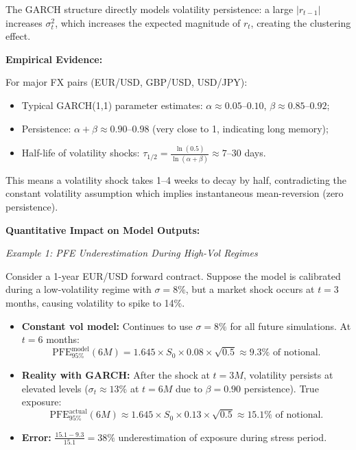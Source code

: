 The GARCH structure directly models volatility persistence: a large $|r_{t-1}|$ increases $\sigma_t^2$, which increases the expected magnitude of $r_t$, creating the clustering effect.

\textbf{Empirical Evidence:}

For major FX pairs (EUR/USD, GBP/USD, USD/JPY):
\begin{itemize}
	\item Typical GARCH(1,1) parameter estimates: $\alpha \approx 0.05$--$0.10$, $\beta \approx 0.85$--$0.92$;
	\item Persistence: $\alpha + \beta \approx 0.90$--$0.98$ (very close to 1, indicating long memory);
	\item Half-life of volatility shocks: $\tau_{1/2} = \frac{\ln(0.5)}{\ln(\alpha + \beta)} \approx 7$--30 days.
\end{itemize}

This means a volatility shock takes 1--4 weeks to decay by half, contradicting the constant volatility assumption which implies instantaneous mean-reversion (zero persistence).

\textbf{Quantitative Impact on Model Outputs:}

\textit{Example 1: PFE Underestimation During High-Vol Regimes}

Consider a 1-year EUR/USD forward contract. Suppose the model is calibrated during a low-volatility regime with $\sigma = 8\%$, but a market shock occurs at $t = 3$ months, causing volatility to spike to 14\%.

\begin{itemize}
	\item \textbf{Constant vol model:} Continues to use $\sigma = 8\%$ for all future simulations. At $t = 6$ months:
	\begin{equation}
		\text{PFE}_{95\%}^{\text{model}}(6M) = 1.645 \times S_0 \times 0.08 \times \sqrt{0.5} \approx 9.3\% \text{ of notional}.
	\end{equation}
	
	\item \textbf{Reality with GARCH:} After the shock at $t = 3M$, volatility persists at elevated levels ($\sigma_t \approx 13\%$ at $t = 6M$ due to $\beta = 0.90$ persistence). True exposure:
	\begin{equation}
		\text{PFE}_{95\%}^{\text{actual}}(6M) \approx 1.645 \times S_0 \times 0.13 \times \sqrt{0.5} \approx 15.1\% \text{ of notional}.
	\end{equation}
	
	\item \textbf{Error:} $\frac{15.1 - 9.3}{15.1} = 38\%$ underestimation of exposure during stress period.
\end{itemize}

